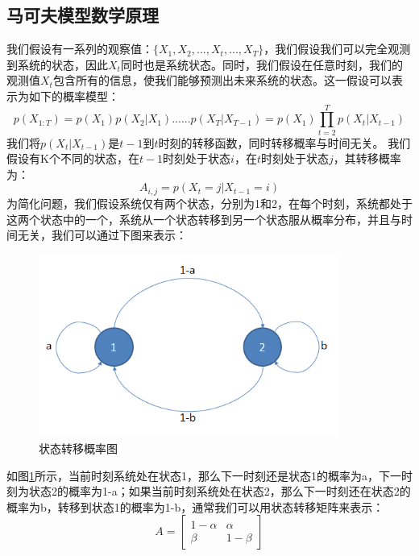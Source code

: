 \subsection{马可夫模型数学原理}
我们假设有一系列的观察值：$\{ X_{1}, X_{2}, ..., X_{t},...,X_{T} \}$，我们假设我们可以完全观测到系统的状态，因此$X_{t}$同时也是系统状态。同时，我们假设在任意时刻，我们的观测值$X_{t}$包含所有的信息，使我们能够预测出未来系统的状态。这一假设可以表示为如下的概率模型：
\begin{equation}
p(X_{1:T})= p(X_{1})p(X_{2} \vert X_{1})......p(X_{T} \vert X_{T-1})=p(X_{1})\prod_{t=2}^{T} p(X_{t} \vert X_{t-1})
\label{e000082}
\end{equation}
我们将$p(X_{t} \vert X_{t-1})$是$t-1$到$t$时刻的转移函数，同时转移概率与时间无关。\newline
我们假设有K个不同的状态，在$t-1$时刻处于状态$i$，在$t$时刻处于状态$j$，其转移概率为：
\begin{equation}
A_{i,j} = p(X_{t}=j \vert X_{t-1}=i)
\label{e000083}
\end{equation}
为简化问题，我们假设系统仅有两个状态，分别为1和2，在每个时刻，系统都处于这两个状态中的一个，系统从一个状态转移到另一个状态服从概率分布，并且与时间无关，我们可以通过下图来表示：
\begin{figure}[H]
	\caption{状态转移概率图}
	\label{f000068}
	\centering
	\includegraphics[height=6cm]{images/f000068}
\end{figure}
如图\ref{f000068}所示，当前时刻系统处在状态1，那么下一时刻还是状态1的概率为a，下一时刻为状态2的概率为1-a；如果当前时刻系统处在状态2，那么下一时刻还在状态2的概率为b，转移到状态1的概率为1-b，通常我们可以用状态转移矩阵来表示：
\begin{equation}
A = \begin{bmatrix}
1-\alpha & \alpha \\
\beta & 1 - \beta
\end{bmatrix}
\label{e000084}
\end{equation}
